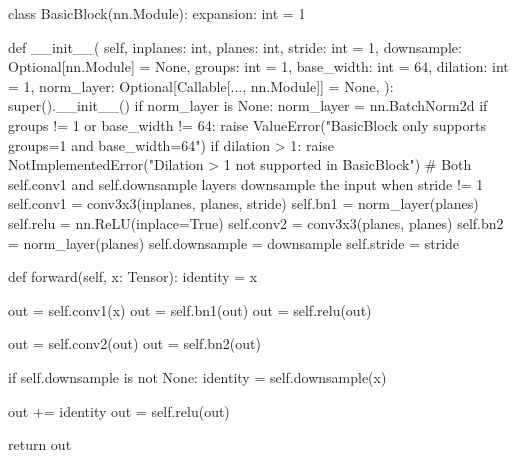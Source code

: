 \begin{codeblock}[language=python]
    class BasicBlock(nn.Module):
        expansion: int = 1
    
        def __init__(
            self,
            inplanes: int,
            planes: int,
            stride: int = 1,
            downsample: Optional[nn.Module] = None,
            groups: int = 1,
            base_width: int = 64,
            dilation: int = 1,
            norm_layer: Optional[Callable[..., nn.Module]] = None,
        ):
            super().__init__()
            if norm_layer is None:
                norm_layer = nn.BatchNorm2d
            if groups != 1 or base_width != 64:
                raise ValueError("BasicBlock only supports groups=1 and base_width=64")
            if dilation > 1:
                raise NotImplementedError("Dilation > 1 not supported in BasicBlock")
            # Both self.conv1 and self.downsample layers downsample the input when stride != 1
            self.conv1 = conv3x3(inplanes, planes, stride)
            self.bn1 = norm_layer(planes)
            self.relu = nn.ReLU(inplace=True)
            self.conv2 = conv3x3(planes, planes)
            self.bn2 = norm_layer(planes)
            self.downsample = downsample
            self.stride = stride
    
        def forward(self, x: Tensor):
            identity = x
    
            out = self.conv1(x)
            out = self.bn1(out)
            out = self.relu(out)
    
            out = self.conv2(out)
            out = self.bn2(out)
    
            if self.downsample is not None:
                identity = self.downsample(x)
    
            out += identity
            out = self.relu(out)
    
            return out
    
    \end{codeblock}
    
    
    
